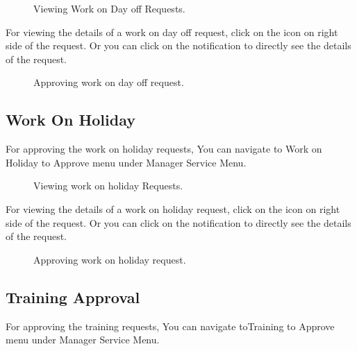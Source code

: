 \documentclass[letterpaper,10pt,english]{sphinxmanual}
\begin{document}
\begin{figure}[htbp]
\centering
\capstart

\noindent{}
\caption{Viewing Work on Day off Requests.}\label{\detokenize{manager/manager-approval:id16}}\end{figure}

For viewing the details of a work on day off request, click on the \sphinxstyleemphasis{} icon on right side of the request. Or you can click on the notification to directly see the details of the request.

\begin{figure}[htbp]
\centering
\capstart

\noindent{}
\caption{Approving work on day off request.}\label{\detokenize{manager/manager-approval:id17}}\end{figure}


\subsection{Work On Holiday}
\label{\detokenize{manager/manager-approval:work-on-holiday}}
For approving the work on holiday requests, You can navigate to Work on Holiday to Approve menu under Manager Service Menu.

\begin{figure}[htbp]
\centering
\capstart

\noindent{}
\caption{Viewing work on holiday Requests.}\label{\detokenize{manager/manager-approval:id18}}\end{figure}

For viewing the details of a work on holiday request, click on the \sphinxstyleemphasis{} icon on right side of the request. Or you can click on the notification to directly see the details of the request.

\begin{figure}[htbp]
\centering
\capstart

\noindent{}
\caption{Approving work on holiday request.}\label{\detokenize{manager/manager-approval:id19}}\end{figure}


\subsection{Training Approval}
\label{\detokenize{manager/manager-approval:training-approval}}
For approving the training requests, You can navigate toTraining to Approve menu under Manager Service Menu.
\end{document}

